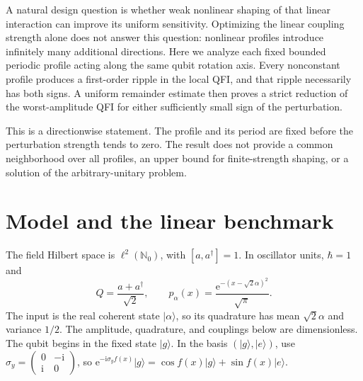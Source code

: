 \documentclass[aps,pra,reprint,amsmath,amssymb,nofootinbib,floatfix]{revtex4-2}
\newcommand{\ii}{\mathrm{i}}
\newcommand{\ee}{\mathrm{e}}
\newcommand{\ket}[1]{\lvert #1\rangle}
\begin{document}
A natural design question is whether weak nonlinear shaping of that
linear interaction can improve its uniform sensitivity. Optimizing the
linear coupling strength alone does not answer this question: nonlinear
profiles introduce infinitely many additional directions. Here we analyze
each fixed bounded periodic profile acting along the same qubit rotation
axis. Every nonconstant profile produces a first-order ripple in the local
QFI, and that ripple necessarily has both signs. A uniform remainder
estimate then proves a strict reduction of the worst-amplitude QFI for
either sufficiently small sign of the perturbation.

This is a directionwise statement. The profile and its period are fixed
before the perturbation strength tends to zero. The result does not
provide a common neighborhood over all profiles, an upper bound for
finite-strength shaping, or a solution of the arbitrary-unitary problem.

\section{Model and the linear benchmark}

The field Hilbert space is $\ell^2(\mathbb N_0)$, with $[a,a^\dagger]=1$.
In oscillator units, $\hbar=1$ and
\begin{equation}
 Q=\frac{a+a^\dagger}{\sqrt2},\qquad
 p_\alpha(x)=\frac{\ee^{-(x-\sqrt2\alpha)^2}}{\sqrt\pi}.
 \label{eq:gaussian}
\end{equation}
The input is the real coherent state $\ket\alpha$, so its quadrature has
mean $\sqrt2\alpha$ and variance $1/2$. The amplitude, quadrature, and
couplings below are dimensionless. The qubit begins in the fixed state
$\ket g$. In the basis $(\ket g,\ket e)$, use
$\sigma_y=\left(\begin{smallmatrix}0&-\ii\\\ii&0\end{smallmatrix}\right)$,
so $\ee^{-\ii\sigma_y f(x)}\ket g=
\cos f(x)\ket g+\sin f(x)\ket e$.
\end{document}
